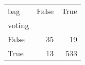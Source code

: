 \begin{tabular}{lrr}
\toprule
bag &  False &  True  \\
voting &        &        \\
\midrule
False  &     35 &     19 \\
True   &     13 &    533 \\
\bottomrule
\end{tabular}
